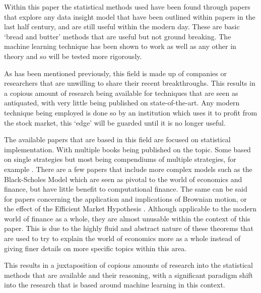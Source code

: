 \documentclass[conference]{IEEEtran}
\begin{document}
Within this paper the statistical methods used have been found through papers that explore any data insight model that have been outlined within papers in the last half century, and are still useful within the modern day. These are basic `bread and butter' methods that are useful but not ground breaking. The machine learning technique has been shown to work as well as any other in theory and so will be tested more rigorously.\\
\fi

As has been mentioned previously, this field is made up of companies or researchers that are unwilling to share their recent breakthroughs. This results in a copious amount of research being available for techniques that are seen as antiquated, with very little being published on state-of-the-art. Any modern technique being employed is done so by an institution which uses it to profit from the stock market, this `edge'  will be guarded until it is no longer useful.

The available papers that are based in this field are focused on statistical implementation. With multiple books being published on the topic. Some based on single strategies but most being compendiums of multiple strategies, for example \cite{Murphy1999}. There are a few papers that include more complex models such as the Black-Scholes Model \cite{Saad2015} which are seen as pivotal to the world of economics and finance, but have little benefit to computational finance. The same can be said for papers concerning the application and implications of Brownian motion, or the effect of the Efficient Market Hypothesis \cite{Meng2016}. Although applicable to the modern world of finance as a whole, they are almost unusable within the context of this paper. This is due to the highly fluid and abstract nature of these theorems that are used to try to explain the world of economics more as a whole instead of giving finer details on more specific topics within this area.

This results in a juxtaposition of copious amounts of research into the statistical methods that are available and their reasoning, with a significant paradigm shift into the research that is based around machine learning in this context.
\end{document}
